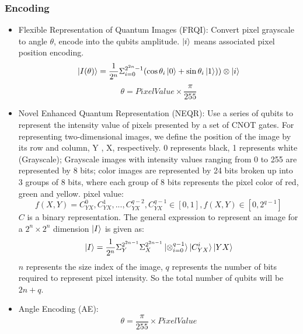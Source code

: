 \documentclass[12pt,a4paper]{article}
\begin{document}
\subsubsection*{Encoding}
\begin{itemize}
    \item Flexible Representation of Quantum Images (FRQI): Convert pixel grayscale to angle $\theta$, encode into the qubits amplitude. $\ket{i}$ means associated pixel position encoding.
    \begin{equation}
            \ket{I(\theta)} = \frac{1}{2^n}\Sigma_{i = 0}^{2^{2n} - 1}(\cos\theta_i\ket{0} + \sin\theta_i\ket{1})) \otimes \ket{i}
    \end{equation}
    \begin{equation}
        \theta = Pixel Value \times \frac{\pi}{255}
    \end{equation}
    \item Novel Enhanced Quantum Representation (NEQR): Use a series of qubits to represent the intensity value of pixels presented by a set of CNOT gates. For representing two-dimensional images, we define the position of the image by its row and column, Y , X, respectively. 0 represents black, 1 represents white (Grayscale); Grayscale images with intensity values
ranging from 0 to 255 are represented by 8 bits; color images are represented by 24 bits broken up into 3 groups of 8 bits, where each group of 8 bits represents the pixel color of red, green and yellow.
pixel value:
\begin{equation}
    f(X, Y) = C_{YX}^0, C_{YX}^1,...,C_{YX}^{q-2}, C_{YX}^{q-1} \in [0, 1], f(X,Y)\in [0, 2^{q-1}]
\end{equation}
$C$ is a binary representation. The general expression to represent an image for a $2^n \times 2^n$ dimension $\ket{I}$ is given as:
\begin{equation}
    \ket{I} = \frac{1}{2^n}\Sigma_{Y}^{2^{2n-1}}\Sigma_{X}^{2^{2n-1}}\ket{\otimes_{i=0}^{q-1}}\ket{C_{YX}^{i}}\ket{YX}
\end{equation}
$n$ represents the size index of the image, $q$ represents the number of bits required to represent pixel intensity. So the total number of qubits will be $2n + q$.
    \item Angle Encoding (AE):
    \begin{equation}
        \theta = \frac{\pi}{255} \times Pixel Value
    \end{equation}
\end{itemize}
\end{document}
